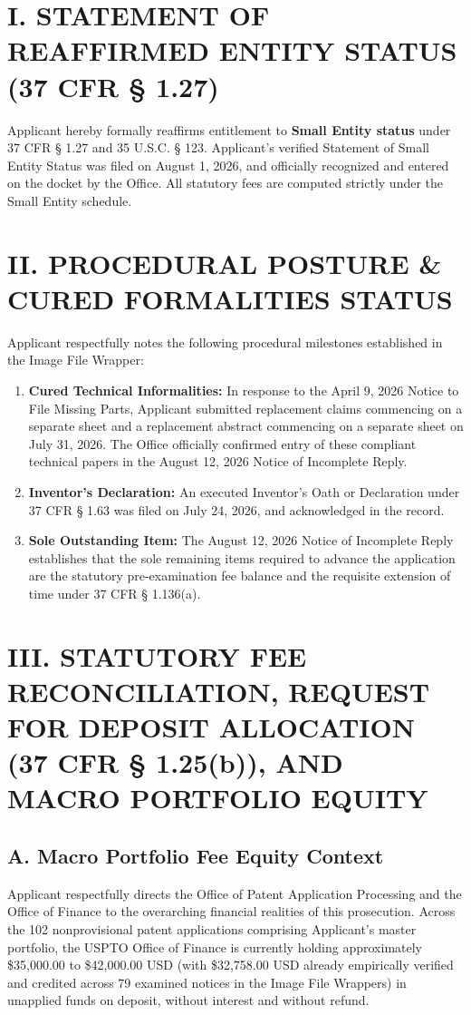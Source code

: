 \documentclass[11pt,letterpaper]{article}
\begin{document}
\section*{I. STATEMENT OF REAFFIRMED ENTITY STATUS (37 CFR \S{} 1.27)}

Applicant hereby formally reaffirms entitlement to \textbf{Small Entity status} under 37 CFR \S{} 1.27 and 35 U.S.C. \S{} 123. Applicant's verified Statement of Small Entity Status was filed on August 1, 2026, and officially recognized and entered on the docket by the Office. All statutory fees are computed strictly under the Small Entity schedule.

\section*{II. PROCEDURAL POSTURE \& CURED FORMALITIES STATUS}

Applicant respectfully notes the following procedural milestones established in the Image File Wrapper:
\begin{enumerate}[leftmargin=*]
    \item \textbf{Cured Technical Informalities:} In response to the April 9, 2026 Notice to File Missing Parts, Applicant submitted replacement claims commencing on a separate sheet and a replacement abstract commencing on a separate sheet on July 31, 2026. The Office officially confirmed entry of these compliant technical papers in the August 12, 2026 Notice of Incomplete Reply.
    \item \textbf{Inventor's Declaration:} An executed Inventor's Oath or Declaration under 37 CFR \S{} 1.63 was filed on July 24, 2026, and acknowledged in the record.
    \item \textbf{Sole Outstanding Item:} The August 12, 2026 Notice of Incomplete Reply establishes that the sole remaining items required to advance the application are the statutory pre-examination fee balance and the requisite extension of time under 37 CFR \S{} 1.136(a).
\end{enumerate}

\section*{III. STATUTORY FEE RECONCILIATION, REQUEST FOR DEPOSIT ALLOCATION (37 CFR \S{} 1.25(b)), AND MACRO PORTFOLIO EQUITY}

\subsection*{A. Macro Portfolio Fee Equity Context}
Applicant respectfully directs the Office of Patent Application Processing and the Office of Finance to the overarching financial realities of this prosecution. Across the 102 nonprovisional patent applications comprising Applicant's master portfolio, the USPTO Office of Finance is currently holding approximately \$35,000.00 to \$42,000.00 USD (with \$32,758.00 USD already empirically verified and credited across 79 examined notices in the Image File Wrappers) in unapplied funds on deposit, without interest and without refund.
\end{document}
